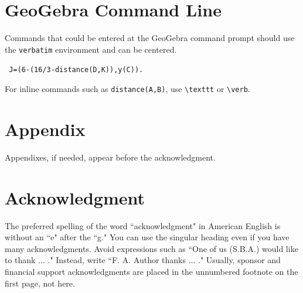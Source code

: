 \section{GeoGebra Command Line}
Commands that could be entered at the GeoGebra command prompt should use the \verb!verbatim! environment and can be centered.
\begin{center}
    \verb! J=(6-(16/3-distance(D,K)),y(C)).!
\end{center}
For inline commands such as \texttt{distance(A,B)}, use \verb!\texttt! or \verb!\verb!.   


\section*{Appendix}
Appendixes, if needed, appear before the acknowledgment.



\section*{Acknowledgment}
The preferred spelling of the word ``acknowledgment" in American English is without an ``e" after the ``g." 
You can use the singular heading even if you have many acknowledgments. 
Avoid expressions such as ``One of us (S.B.A.) would like to thank ... ." Instead, write ``F. A. Author thanks ... ." 
Usually, sponsor and financial support acknowledgments are placed in the unnumbered footnote on the first page, not here.


